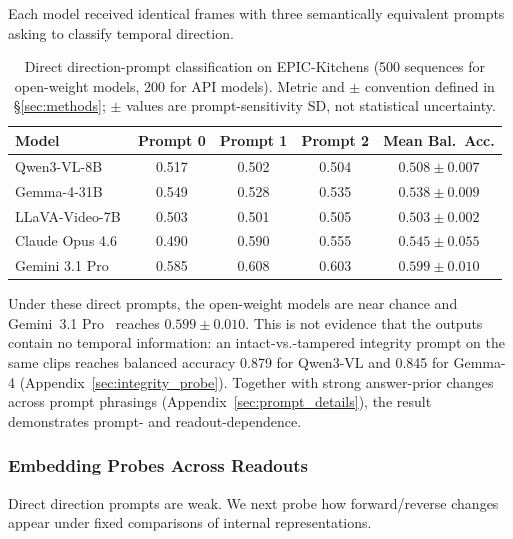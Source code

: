\documentclass{article}
\theoremstyle{remark}
\begin{document}
Each model received identical frames with three semantically equivalent prompts asking to classify temporal direction.

\begin{table}[ht]
\centering
\caption{Direct direction-prompt classification on EPIC-Kitchens (500 sequences for open-weight models, 200 for API models). Metric and $\pm$ convention defined in \S\ref{sec:methods}; $\pm$ values are prompt-sensitivity SD, not statistical uncertainty.}
\label{tab:vlm_generative}
\begin{tabular}{lcccc}
\toprule
\textbf{Model} & \textbf{Prompt 0} & \textbf{Prompt 1} & \textbf{Prompt 2} & \textbf{Mean Bal.\ Acc.} \\
\midrule
Qwen3-VL-8B & 0.517 & 0.502 & 0.504 & $0.508 \pm 0.007$ \\
Gemma-4-31B & 0.549 & 0.528 & 0.535 & $0.538 \pm 0.009$ \\
LLaVA-Video-7B & 0.503 & 0.501 & 0.505 & $0.503 \pm 0.002$ \\
\midrule
Claude Opus 4.6~\cite{claude4opus} & 0.490 & 0.590 & 0.555 & $0.545 \pm 0.055$ \\
Gemini 3.1 Pro & 0.585 & 0.608 & 0.603 & $0.599 \pm 0.010$ \\
\bottomrule
\end{tabular}
\end{table}

Under these direct prompts, the open-weight models are near chance and Gemini~3.1 Pro~\cite{gemini31pro} reaches $0.599 \pm 0.010$. This is not evidence that the outputs contain no temporal information: an intact-vs.-tampered integrity prompt on the same clips reaches balanced accuracy 0.879 for Qwen3-VL and 0.845 for Gemma-4 (Appendix~\ref{sec:integrity_probe}). Together with strong answer-prior changes across prompt phrasings (Appendix~\ref{sec:prompt_details}), the result demonstrates prompt- and readout-dependence.

\subsubsection{Embedding Probes Across Readouts}
\label{sec:vlm_embedding}

Direct direction prompts are weak. We next probe how forward/reverse changes appear under fixed comparisons of internal representations.
\end{document}
